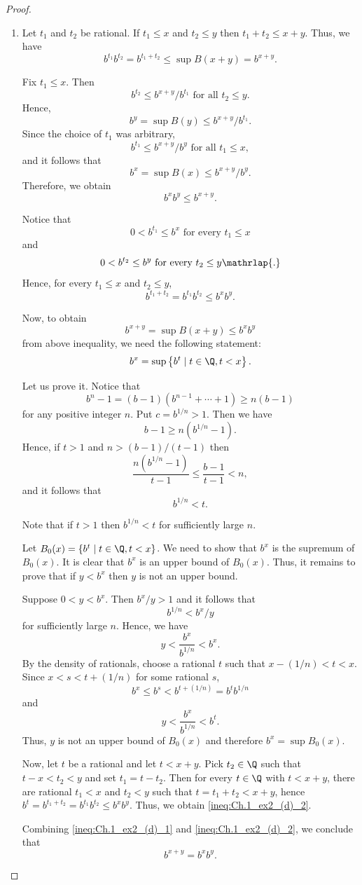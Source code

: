 \begin{proof}
\begin{enumerate}
\item[(d)]
Let $t_1$ and $t_2$ be rational. 
If $t_1 \leq x$ and $t_2 \leq y$ then $t_1+t_2 \leq x+y$.
Thus, we have
\[
b^{t_1}b^{t_2} = b^{t_1+t_2} \leq \sup B(x+y) =b^{x+y}.
\]

Fix $t_1\leq x$. Then 
\[
b^{t_2} \leq b^{x+y}/b^{t_1} \text{ for all } t_2 \leq y.
\]
Hence, 
\[
b^y = \sup B(y) \leq b^{x+y}/b^{t_1}.
\]
Since the choice of $t_1$ was arbitrary,
\[
b^{t_1} \leq b^{x+y}/b^y \text{ for all } t_1 \leq x,
\]
and it follows that
\[
b^x = \sup B(x) \leq b^{x+y}/b^y.
\]
Therefore, we obtain
\begin{equation} \label{ineq:Ch.1_ex2_(d)_1}
    b^xb^y \leq b^{x+y}.
\end{equation}

Notice that 
\[
0 < b^{t_1} \leq b^x \text{ for every } t_1 \leq x
\]
and 
\[
0 < b^{t_2} \leq b^y \text{ for every } t_2 \leq y \mathrlap{.}
\]
Hence, for every $t_1 \leq x$ and $t_2 \leq y$, 
\[
b^{t_1+t_2} = b^{t_1}b^{t_2} \leq b^xb^y.
\]

Now, to obtain
\begin{equation}\label{ineq:Ch.1_ex2_(d)_2}
b^{x+y} = \sup B(x+y) \leq b^xb^y
\end{equation}
from above inequality, we need the following statement:
\[
b^x=\sup \left\{b^t \mid t \in \Q, t<x\right\}.
\]

Let us prove it. Notice that
\[
b^n-1=(b-1)(b^{n-1}+ \cdots + 1) \geq n(b-1)
\]
for any positive integer $n$. Put $c=b^{1/n}>1$. Then we have
\[
b-1 \geq n(b^{1/n}-1).
\]
Hence, if $t>1$ and $n>(b-1)/(t-1)$ then
\[
\frac{n(b^{1/n}-1)}{t-1} \leq \frac{b-1}{t-1} < n,
\]
and it follows that
\[
b^{1/n}<t.
\]

Note that if $t>1$ then $b^{1/n}<t$ for sufficiently large $n$.

Let $B_0(x)=\left\{b^t \mid t \in \Q, t<x\right\}$.
We need to show that $b^x$ is the supremum of $B_0(x)$. 
It is clear that $b^x$ is an upper bound of $B_0(x)$.
Thus, it remains to prove that if $y<b^x$ then $y$ is not an upper bound.

Suppose $0<y<b^x$. Then $b^x/y >1$ and it follows that
\[
b^{1/n} <b^x/y
\]
for sufficiently large $n$. 
Hence, we have
\[
y<\frac{b^x}{b^{1/n}}<b^x.
\]
By the density of rationals, choose a rational $t$ such that $x-(1/n)<t<x$. 
Since $x<s<t+(1/n)$ for some rational $s$, 
\[
b^x \leq b^s <b^{t+(1/n)} = b^tb^{1/n}
\]
and
\[
y<\frac{b^x}{b^{1/n}}<b^t.
\]
Thus, $y$ is not an upper bound of $B_0(x)$ and therefore $b^x = \sup B_0(x)$.

Now, let $t$ be a rational and let $t<x+y$.
Pick $t_2 \in \Q$ such that $t-x<t_2<y$ and set $t_1=t-t_2$.
Then for every $t \in \Q$ with $t<x+y$, there are rational $t_1<x$ and $t_2<y$ such that $t=t_1+t_2<x+y$, hence $b^t=b^{t_1+t_2}=b^{t_1}b^{t_2} \leq b^xb^y$.
Thus, we obtain \eqref{ineq:Ch.1_ex2_(d)_2}.

Combining \eqref{ineq:Ch.1_ex2_(d)_1} and \eqref{ineq:Ch.1_ex2_(d)_2}, we conclude that
\[
b^{x+y}=b^xb^y.
\]
\end{enumerate}
\end{proof}

